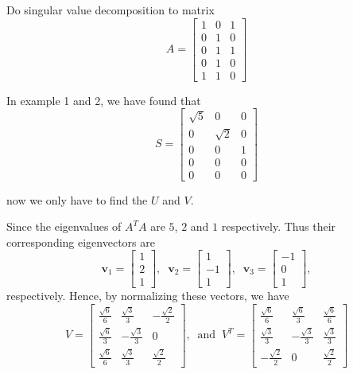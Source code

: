 \begin{ex}
	Do singular value decomposition to matrix
	\[ A = \begin{bmatrix}
	1&0&1\\ 0&1&0\\ 0&1&1\\ 0&1&0\\ 1&1&0
	\end{bmatrix} \]
	
	\begin{solution}
		In example 1 and 2, we have found that 
		\[ S = \begin{bmatrix}
		\sqrt{5}&0&0\\ 0&\sqrt{2}&0\\ 0&0&1\\ 0&0&0\\ 0&0&0
		\end{bmatrix}  \]
		
		now we only have to find the $U$ and $V$.
		
		Since the eigenvalues of $A^TA$ are $5$, $2$ and $1$ respectively. Thus their corresponding eigenvectors are
		\[ \mathbf{v}_1 = \begin{bmatrix}1\\2\\1\end{bmatrix},\;\;
		  \mathbf{v}_2 = \begin{bmatrix}1\\-1\\1\end{bmatrix},\;\;
		  \mathbf{v}_3 = \begin{bmatrix}-1\\0\\1\end{bmatrix},\]
		 respectively. Hence, by normalizing these vectors, we have
		 \[ V = \begin{bmatrix}
		 \frac{\sqrt{6}}{6} & \frac{\sqrt{3}}{3} & -\frac{\sqrt{2}}{2}\\ \frac{\sqrt{6}}{3} & -\frac{\sqrt{3}}{3} & 0\\
		 \frac{\sqrt{6}}{6} & \frac{\sqrt{3}}{3} & \frac{\sqrt{2}}{2}
		 \end{bmatrix},\;\;\text{and}\;\;
		 V^T = \begin{bmatrix}
		 \frac{\sqrt{6}}{6} & \frac{\sqrt{6}}{3} & \frac{\sqrt{6}}{6}\\
		 \frac{\sqrt{3}}{3} & -\frac{\sqrt{3}}{3} & \frac{\sqrt{3}}{3}\\
		 -\frac{\sqrt{2}}{2} & 0 & \frac{\sqrt{2}}{2}
		 \end{bmatrix} \]
		 

\end{solution}
\end{ex}
